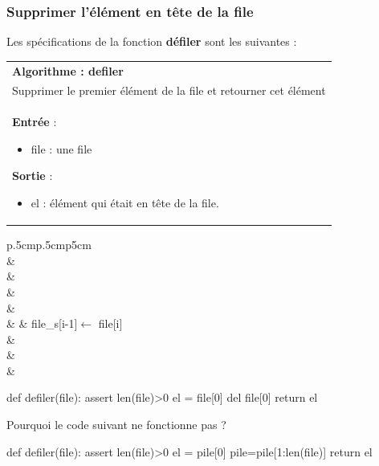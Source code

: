 \documentclass[10pt,fleqn]{article} %
\begin{document}
\subsubsection{Supprimer l'élément en tête de la file}
Les spécifications de la fonction \textbf{défiler} sont les suivantes :

\begin{tabular}{p{\linewidth}}
\hline
\textbf{Algorithme : defiler} \\
Supprimer le premier élément de la file et retourner cet élément\\
\hline
\textbf{Entrée} : 
\begin{itemize}
\item file : une file
\end{itemize}
\textbf{Sortie} : 
\begin{itemize}
\item el : élément qui était en tête de la file.
\end{itemize} \\
\hline 
\end{tabular}

\vspace{.5cm}

\noindent \begin{minipage}[c]{.48\linewidth}
\begin{pseudo}
\begin{tabular}{p{.5cm}p{.5cm}p{5cm}}
\hline
{}  \\
& \\
& \\
& \\
& \\
& & file\_s[i-1]$\leftarrow$ file[i]\\
& \\
& \\
& \\

\hline
\end{tabular}
\end{pseudo}
\end{minipage}\hfill
\begin{minipage}[c]{.48\linewidth}
\begin{py}
\begin{python}
def defiler(file):
    assert len(file)>0
    el = file[0]
    del file[0]
    return el
\end{python}
\end{py}
\end{minipage}
\begin{rem}
Pourquoi le code suivant ne fonctionne pas ?
\begin{python}
def defiler(file):
    assert len(file)>0
    el = pile[0]
    pile=pile[1:len(file)]
    return el
\end{python}
\end{rem}
\end{document}

